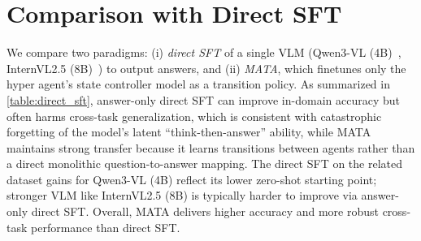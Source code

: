 \documentclass{article} %
\newcommand{\revise}[1]{{#1}}
\newcommand{\methodname}{MATA}
\begin{document}
\section{\revise{Comparison with Direct SFT}}
\label{sec:more_analysis_compare_direct_sft}

\revise{We compare two paradigms: (i) \emph{direct SFT} of a single VLM (Qwen3-VL (4B)~\citep{bai_qwen3-vl_2025}, InternVL2.5 (8B)~\citep{chen_expanding_2025}) to output answers, and (ii) \emph{\methodname{}}, which finetunes only the hyper agent’s state controller model as a transition policy. As summarized in \autoref{table:direct_sft}, answer-only direct SFT can improve in-domain accuracy but often harms cross-task generalization, which is consistent with catastrophic forgetting of the model’s latent ``think-then-answer'' ability, while \methodname{} maintains strong transfer because it learns transitions between agents rather than a direct monolithic question-to-answer mapping. The direct SFT on the related dataset gains for Qwen3-VL (4B) reflect its lower zero-shot starting point; stronger VLM like InternVL2.5 (8B) is typically harder to improve via answer-only direct SFT. Overall, \methodname{} delivers higher accuracy and more robust cross-task performance than direct SFT.}
\end{document}

